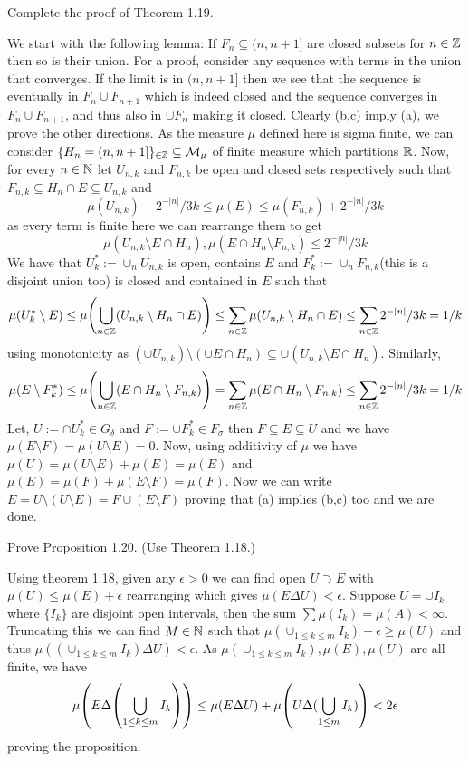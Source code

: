 \documentclass[12pt,a4paper]{article}
\begin{document}
\begin{problem}\label{prob:1-25}
Complete the proof of Theorem 1.19.
\end{problem}
\begin{solution}
    We start with the following lemma: If $F_n\subseteq(n,n+1]$ are closed subsets for $n\in\mathbb{Z}$ then so is their union. 
    For a proof, consider any sequence with terms in the union that converges. 
    If the limit is in $(n,n+1]$ then we see that the sequence is eventually in $F_n\cup F_{n+1}$ which is indeed closed and the sequence converges in $F_n\cup F_{n+1}$, and thus also in $\cup F_n$ making it closed. 
    Clearly (b,c) imply (a), we prove the other directions. 
    As the measure $\mu$ defined here is sigma finite, we can consider $\{H_n=(n,n+1]\}_{\in\mathbb{Z}}\subseteq\mathcal{M}_\mu$ of finite measure which partitions $\mathbb{R}$. 
    Now, for every $n\in\mathbb{N}$ let $U_{n,k}$ and $F_{n,k}$ be open and closed sets respectively such that $F_{n,k}\subseteq H_n\cap E\subseteq U_{n,k}$ and
    $$\mu(U_{n,k})-2^{-|n|}/3k\leq\mu(E)\leq\mu(F_{n,k})+2^{-|n|}/3k$$
    as every term is finite here we can rearrange them to get
    $$\mu(U_{n,k}\setminus E\cap H_n),\mu(E\cap H_n\setminus F_{n,k})\leq 2^{-|n|}/3k$$
    We have that $U^*_k:=\cup_n U_{n,k}$ is open, contains $E$ and $F^*_k:=\cup_n F_{n,k}$(this is a disjoint union too) is closed and contained in $E$ such that
    $$\mu\qty(U^*_k\setminus E)\leq\mu\qty(\bigcup_{n\in\mathbb{Z}}(U_{n,k}\setminus H_n\cap E))\leq\sum_{n\in\mathbb{Z}}\mu(U_{n,k}\setminus H_n\cap E)\leq\sum_{n\in\mathbb{Z}}2^{-|n|}/3k=1/k$$
    using monotonicity as $(\cup U_{n,k})\setminus(\cup E\cap H_n)\subseteq\cup(U_{n,k}\setminus E\cap H_n)$.
    Similarly,
    $$\mu\qty(E\setminus F^*_k)\leq\mu\qty(\bigcup_{n\in\mathbb{Z}}(E\cap H_n\setminus F_{n,k}))=\sum_{n\in\mathbb{Z}}\mu(E\cap H_n\setminus F_{n,k})\leq\sum_{n\in\mathbb{Z}}2^{-|n|}/3k=1/k$$ 
    Let, $U:=\cap U^*_k\in G_\delta$ and $F:=\cup F^*_k\in F_\sigma$ then $F\subseteq E\subseteq U$ and we have $\mu(E\setminus F)=\mu(U\setminus E)=0$. 
    Now, using additivity of $\mu$ we have $\mu(U)=\mu(U\setminus E)+\mu(E)=\mu(E)$ and $\mu(E)=\mu(F)+\mu(E\setminus F)=\mu(F)$. 
    Now we can write $E=U\setminus(U\setminus E)=F\cup(E\setminus F)$ proving that (a) implies (b,c) too and we are done.

\end{solution} 
\begin{problem}\label{prob:1-26}
Prove Proposition 1.20. (Use Theorem 1.18.)
\end{problem}
\begin{solution}
    Using theorem 1.18, given any $\epsilon>0$ we can find open $U\supset E$ with $\mu(U)\leq\mu(E)+\epsilon$ rearranging which gives $\mu(E\Delta U)<\epsilon$.
    Suppose $U=\cup I_k$ where $\{I_k\}$ are disjoint open intervals, then the sum $\sum\mu(I_k)=\mu(A)<\infty$. 
    Truncating this we can find $M\in\mathbb{N}$ such that $\mu(\cup_{1\leq k\leq m}I_k)+\epsilon\geq\mu(U)$ and thus $\mu((\cup_{1\leq k\leq m}I_k)\Delta U)<\epsilon$.
    As $\mu(\cup_{1\leq k\leq m}I_k),\mu(E),\mu(U)$ are all finite, we have
    $$\mu\qty(E\Delta\qty(\bigcup_{1\leq k\leq m}I_k))\leq\mu\qty(E\Delta U)+\mu\qty(U\Delta(\bigcup_{1\leq m}I_k))<2\epsilon$$
    proving the proposition.
\end{solution}
\end{document}

